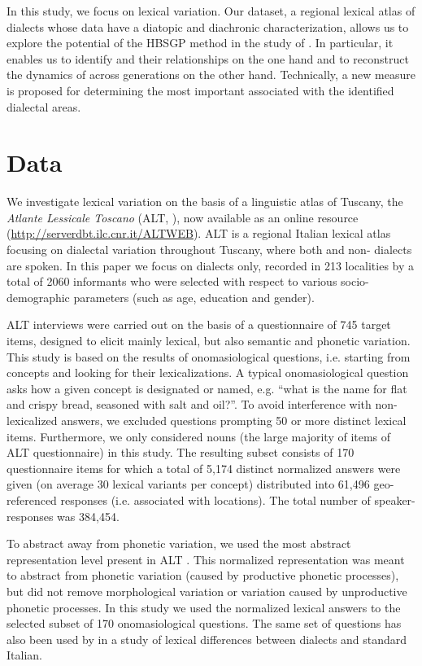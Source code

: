 \documentclass[output=paper]{LSP/langsci}
\begin{document}
In this study, we focus on lexical variation. Our dataset, a regional lexical atlas of  dialects whose data have a diatopic and diachronic characterization, allows us to explore the potential of the HBSGP method in the study of . In particular, it enables us to identify  and their relationships on the one hand and to reconstruct the dynamics of  across generations on the other hand. Technically, a new measure is proposed for determining the most important  associated with the identified dialectal areas.

\section{Data}
We investigate  lexical variation on the basis of a linguistic atlas of Tuscany, the \textit{Atlante Lessicale Toscano} (ALT, \citealt{giacomelli_atlante_2000}), now available as an online resource (\url{http://serverdbt.ilc.cnr.it/ALTWEB}). ALT is a regional Italian lexical atlas focusing on dialectal variation throughout Tuscany, where both  and non- dialects are spoken. In this paper we focus on  dialects only, recorded in 213 localities by a total of 2060 informants who were selected with respect to various socio-demographic parameters (such as age, education and gender). 

ALT interviews were carried out on the basis of a questionnaire of 745 target items, designed to elicit mainly lexical, but also semantic and phonetic variation. This study is based on the results of onomasiological questions, i.e. starting from concepts and looking for their lexicalizations. A typical onomasiological question asks how a given concept is designated or named, e.g. “what is the name for flat and crispy bread, seasoned with salt and oil?”. To avoid interference with non-lexicalized answers, we excluded questions prompting 50 or more distinct lexical items. Furthermore, we only considered nouns (the large majority of items of ALT questionnaire) in this study. The resulting subset consists of 170 questionnaire items for which a total of 5,174 distinct normalized answers were given (on average 30 lexical variants per concept) distributed into 61,496 geo-referenced responses (i.e. associated with locations). The total number of speaker-responses was 384,454. 

To abstract away from phonetic variation, we used the most abstract representation level present in ALT \citep{cucurullo_dialectal_2006}. This normalized representation was meant to abstract from phonetic variation (caused by productive phonetic processes), but did not remove morphological variation or variation caused by unproductive phonetic processes. In this study we used the normalized lexical answers to the selected subset of 170 onomasiological questions. The same set of questions has also been used by \citet{wieling_analyzing_2014} in a study of lexical differences between  dialects and standard Italian.
\end{document}
